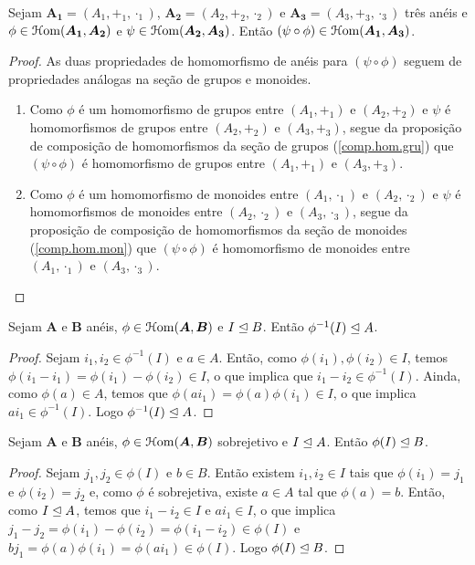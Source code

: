 \begin{coro}
\label{prop:comp.hom.ane}
	Sejam $\bm{A_1}=(A_1,+_1,\cdot_1)$, $\bm{A_2}=(A_2,+_2,\cdot_2)$ e $\bm{A_3}=(A_3,+_3,\cdot_3)$ três anéis e $\phi \in \mathcal{H}\mathrm{om}(\bm{A_1},\bm{A_2})$ e $\psi \in \mathcal{H}\mathrm{om}(\bm{A_2},\bm{A_3})$. Então $(\psi \circ \phi) \in \mathcal{H}\mathrm{om}(\bm{A_1},\bm{A_3})$.
\end{coro}
\begin{proof} As duas propriedades de homomorfismo de anéis para $(\psi \circ \phi)$ seguem de propriedades análogas na seção de grupos e monoides.
	\begin{enumerate}
	\item Como $\phi$ é um homomorfismo de grupos entre $(A_1,+_1)$ e $(A_2,+_2)$ e $\psi$ é homomorfismos de grupos entre $(A_2,+_2)$ e $(A_3,+_3)$, segue da proposição de composição de homomorfismos da seção de grupos (\ref{comp.hom.gru}) que $(\psi \circ \phi)$ é homomorfismo de grupos entre $(A_1,+_1)$ e $(A_3,+_3)$.
	\item Como $\phi$ é um homomorfismo de monoides entre $(A_1,\cdot_1)$ e $(A_2,\cdot_2)$ e $\psi$ é homomorfismos de monoides entre $(A_2,\cdot_2)$ e $(A_3,\cdot_3)$, segue da proposição de composição de homomorfismos da seção de monoides (\ref{comp.hom.mon}) que $(\psi \circ \phi)$ é homomorfismo de monoides entre $(A_1,\cdot_1)$ e $(A_3,\cdot_3)$.
	\end{enumerate}
\end{proof}

\begin{prop}
\label{prop:ide.im.inv}
	Sejam $\bm A$ e $\bm B$ anéis, $\phi \in \mathcal{H}\mathrm{om}(\bm A,\bm B)$ e $I \mathrel{\unlhd} B$. Então $\phi^{-1}(I) \mathrel{\unlhd} A$.
\end{prop}
\begin{proof}
	Sejam $i_1,i_2 \in \phi^{-1}(I)$ e $a \in A$. Então, como $\phi(i_1),\phi(i_2) \in I$, temos $\phi(i_1-i_1)=\phi(i_1)-\phi(i_2) \in I$, o que implica que $i_1-i_2 \in \phi^{-1}(I)$. Ainda, como $\phi(a) \in A$, temos que $\phi(ai_1)=\phi(a)\phi(i_1) \in I$, o que implica $ai_1 \in \phi^{-1}(I)$. Logo $\phi^{-1}(I) \mathrel{\unlhd} A$.
\end{proof}

\begin{prop}
\label{prop:ide.im.ide}
	Sejam $\bm A$ e $\bm B$ anéis, $\phi \in \mathcal{H}\mathrm{om}(\bm A,\bm B)$ sobrejetivo e $I \mathrel{\unlhd} A$. Então $\phi(I) \mathrel{\unlhd} B$.
\end{prop}
\begin{proof}
	Sejam $j_1,j_2 \in \phi(I)$ e $b \in B$. Então existem $i_1,i_2 \in I$ tais que $\phi(i_1)=j_1$ e $\phi(i_2)=j_2$ e, como $\phi$ é sobrejetiva, existe $a \in A$ tal que $\phi(a)=b$. Então, como $I \mathrel{\unlhd} A$, temos que $i_1-i_2 \in I$ e $ai_1 \in I$, o que implica $j_1-j_2 = \phi(i_1)-\phi(i_2) =\phi(i_1-i_2) \in \phi(I)$ e $bj_1=\phi(a)\phi(i_1)=\phi(ai_1) \in \phi(I)$. Logo $\phi(I) \mathrel{\unlhd} B$.
\end{proof}

